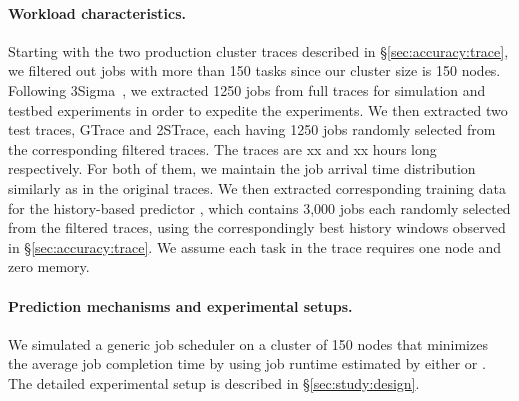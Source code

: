 
\paragraph{Workload characteristics.}
{Starting with the two production cluster traces described in
  \S\ref{sec:accuracy:trace}, we filtered out jobs with more than 150
  tasks since our cluster size is 150 nodes.
Following 3Sigma~\cite{3Sigma}, we extracted 1250 jobs from full traces for simulation
and testbed experiments in order to expedite the experiments.
% 
We then extracted two test traces, GTrace and 2STrace, each having
1250 jobs randomly selected from the corresponding filtered
traces. The traces are xx and xx hours long respectively.  For
both of them, we maintain the job arrival time distribution similarly
as in the original traces.  We then extracted corresponding training
data for the history-based predictor \primarybasepredict, which
contains 3,000 jobs each randomly selected from the filtered traces,
using the correspondingly best history windows observed in
\S\ref{sec:accuracy:trace}.
\rm{We assume each task in the trace requires one node and zero memory.}
\fi


\paragraph{Prediction mechanisms and experimental setups.}
We simulated a generic job scheduler on a cluster of 150 nodes
that minimizes the average job completion time by using
job runtime estimated by either \lTechnique or \primarybasepredict.
The detailed experimental setup is described in \S\ref{sec:study:design}.

}

